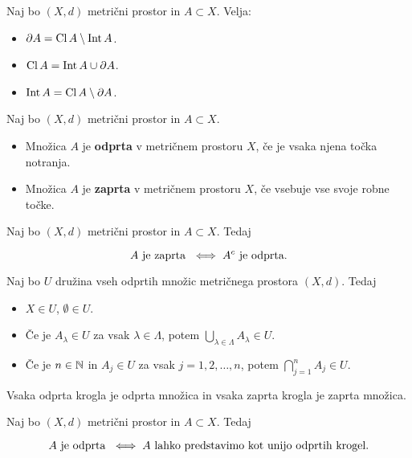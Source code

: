\begin{trditev}
    Naj bo $(X, d)$ metrični prostor in $A \subset X$. Velja:
    \begin{itemize}
        \item $\partial A = \operatorname{Cl} A \setminus \operatorname{Int} A$.
        \item $\operatorname{Cl} A = \operatorname{Int} A \cup \partial A$.
        \item $\operatorname{Int} A = \operatorname{Cl} A \setminus \partial A$.
    \end{itemize}
\end{trditev}

\begin{definicija}    
    Naj bo $(X, d)$ metrični prostor in $A \subset X$.
    \begin{itemize}
        \item Množica $A$ je \textbf{odprta} v metričnem prostoru $X$, če je vsaka njena točka notranja.
        \item Množica $A$ je \textbf{zaprta} v metričnem prostoru $X$, če vsebuje vse svoje robne točke.
    \end{itemize}
\end{definicija}

\begin{trditev}
    Naj bo $(X, d)$ metrični prostor in $A \subset X$. Tedaj

    $$A \text{ je zaprta } \iff A^c \text{ je odprta}.$$
\end{trditev}

\begin{izrek}
    Naj bo $U$ družina vseh odprtih množic metričnega prostora $(X, d)$. Tedaj
    \begin{itemize}
        \item $X \in U$, $\emptyset \in U$.
        \item Če je $A_\lambda \in U$ za vsak $\lambda \in \Lambda$, potem $ \bigcup_{\lambda \in \Lambda} A_\lambda \in U$.
        \item Če je $n \in \mathbb{N}$ in $A_j \in U$ za vsak $j = 1, 2, \ldots, n$, potem $ \bigcap_{j=1}^n A_j \in U$.
    \end{itemize}
\end{izrek}

\begin{trditev}
    Vsaka odprta krogla je odprta množica in vsaka zaprta krogla je zaprta množica.
\end{trditev}

\begin{trditev}
    Naj bo $(X, d)$ metrični prostor in $A \subset X$. Tedaj

    $$A \text{ je odprta } \iff A \text{ lahko predstavimo kot unijo odprtih krogel}.$$
\end{trditev}

